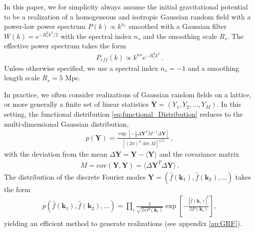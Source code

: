 \documentclass[a4paper, 11pt]{article}
\begin{document}
\begin{framed}
In this paper, we for simplicity always assume the initial gravitational potential to be a realization of a homogeneous and isotropic Gaussian random field with a power-law power spectrum $P(k) \propto k^{n_s}$ smoothed with a Gaussian filter $W(k)=e^{-R_s^2 k^2/2}$ with the spectral index $n_s$ and the smoothing scale $R_s$. The effective power spectrum takes the form 
\begin{align}
P_{eff}(k)\propto k^{ns}e^{-R_s^2 k^2}\,.
\end{align}
Unless otherwise specified, we use a spectral index $n_s=-1$ and a smoothing length scale $R_s = 5\text{ Mpc}$. 
\end{framed}


In practice, we often consider realizations of Gaussian random fields on a lattice, or more generally a finite set of linear statistics $\bm{Y}=(Y_1,Y_2,\dots,Y_M)$. In this setting, the functional distribution \eqref{eq:functional_Distribution} reduces to the multi-dimensional Gaussian distribution,
\begin{align}
p(\bm{Y}) = \frac{\exp\left[-\frac{1}{2}  \Delta \bm{Y}^T M^{-1} \Delta \bm{Y}\right]}{[(2\pi)^n \det M]^{1/2}}\,,
\end{align}
with the deviation from the mean $\Delta \bm{Y} = \bm{Y} - \langle \bm{Y}\rangle$ and the covariance matrix
\begin{align}
M = \text{cov}(\bm{Y},\bm{Y}) = \langle \Delta \bm{Y}^T \Delta \bm{Y}\rangle\,.
\end{align}
The distribution of the discrete Fourier modes $\bm{Y}=(\hat{f}(\bm{k}_1),\hat{f}(\bm{k}_2),\dots)$ takes the form 
\begin{align}
p(\hat{f}(\bm{k}_1), \hat{f}(\bm{k}_2), \dots) = \prod_{i} \frac{1}{\sqrt{2\pi P( \bm{k}_i)}} \exp\left[-\frac{|\hat{f}(\bm{k}_i)|^2}{2P(\bm{k}_i)}\right],
\end{align}
yielding an efficient method to generate realizations (see appendix \ref{ap:GRF}).
\end{document}
